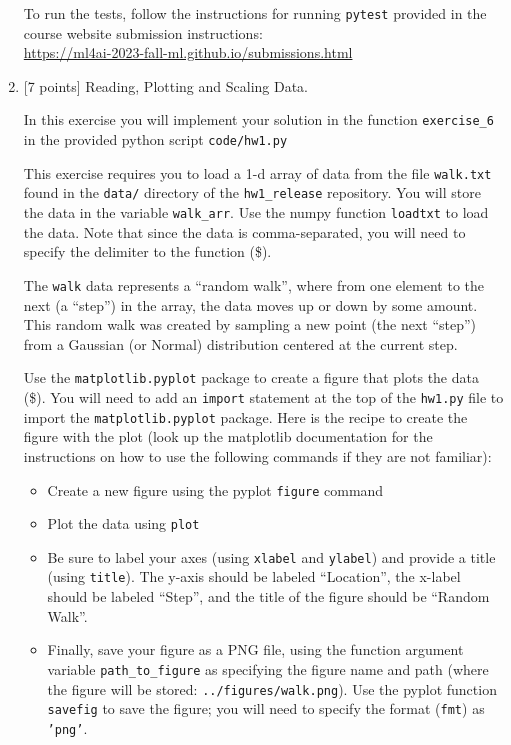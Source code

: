 \documentclass[10pt]{article}
\begin{document}
\begin{enumerate}
To run the tests, follow the instructions for running {\tt pytest} provided in the course website submission instructions:\\
\url{https://ml4ai-2023-fall-ml.github.io/submissions.html}

\vspace{1cm}



\item \label{prob:6} [7 points]
Reading, Plotting and Scaling Data.

In this exercise you will implement your solution in the function {\tt exercise\_6} in the provided python script {\tt code/hw1.py}

This exercise requires you to load a 1-d array of data from the file {\tt walk.txt} found in the {\tt data/} directory of the {\tt hw1\_release} repository. You will store the data in the variable {\tt walk\_arr}. Use the numpy function {\tt loadtxt} to load the data. Note that since the data is comma-separated, you will need to specify the delimiter to the function (\$).

The {\tt walk} data represents a ``random walk'', where from one element to the next (a ``step'') in the array, the data moves up or down by some amount. This random walk was created by sampling a new point (the next ``step'') from a Gaussian (or Normal) distribution centered at the current step.

Use the {\tt matplotlib.pyplot} package to create a figure that plots the data (\$). You will need to add an {\tt import} statement at the top of the {\tt hw1.py} file to import the {\tt matplotlib.pyplot} package. Here is the recipe to create the figure with the plot (look up the matplotlib documentation for the instructions on how to use the following commands if they are not familiar):
\begin{itemize}
\item Create a new figure using the pyplot {\tt figure} command
\item Plot the data using {\tt plot}
\item Be sure to label your axes (using {\tt xlabel} and {\tt ylabel}) and provide a title (using {\tt title}). The y-axis should be labeled ``Location'', the x-label should be labeled ``Step'', and the title of the figure should be ``Random Walk''.
\item Finally, save your figure as a PNG file, using the function argument variable {\tt path\_to\_figure} as specifying the figure name and path (where the figure will be stored: {\tt ../figures/walk.png}). Use the pyplot function {\tt savefig} to save the figure; you will need to specify the format ({\tt fmt}) as {\tt 'png'}.
\end{itemize}


\end{enumerate}
\end{document}
